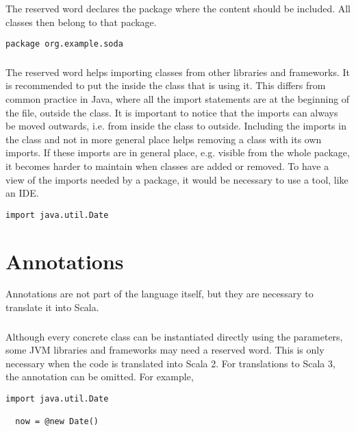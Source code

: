 The reserved word \sodapackage declares the package where the content should be included.
All classes then belong to that package.

\begin{lstlisting}[label={lst:examplePackage}]
  package org.example.soda
\end{lstlisting}

\subsubsection{\sodaimport}

The reserved word \sodaimport helps importing classes from other libraries and frameworks.
It is recommended to put the \sodaimport inside the class that is using it.
This differs from common practice in Java, where all the import statements are at the beginning of the file, outside the class.
It is important to notice that the imports can always be moved outwards, i.e. from inside the class to outside.
Including the imports in the class and not in more general place helps removing a class with its own imports.
If these imports are in general place, e.g. visible from the whole package, it becomes harder to maintain when classes are added or removed.
To have a view of the imports needed by a package, it would be necessary to use a tool, like an IDE.


\begin{lstlisting}[label={lst:exampleImport}]
  import java.util.Date
\end{lstlisting}


\section{Annotations}

Annotations are not part of the language itself, but they are necessary to translate it into Scala.

\subsubsection{\sodanew}

Although every concrete class can be instantiated directly using the parameters, some JVM libraries and frameworks may need a \sodanew reserved word.
This is only necessary when the code is translated into Scala 2.
For translations to Scala 3, the \sodanew annotation can be omitted.
For example,

\begin{lstlisting}[label={lst:exampleImportDate}]
  import java.util.Date

  now = @new Date()
\end{lstlisting}

